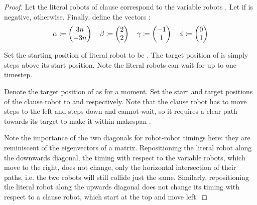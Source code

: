 \begin{proof}

	Let the literal robots  of clause  correspond to the variable robots . Let  if  is negative,  otherwise. Finally, define the vectors \ilmath{\set{\alpha,\ \beta,\ \gamma,\ \phi}}:
	\begin{align*}
	\alpha \coloneqq \begin{pmatrix} 3n \\ -3n \end{pmatrix} \quad 
	\beta \coloneqq \begin{pmatrix} 2 \\ 2 \end{pmatrix} \quad 
	\gamma \coloneqq \begin{pmatrix} -1 \\ 1 \end{pmatrix} \quad 
	\phi \coloneqq \begin{pmatrix} 0 \\ 1 \end{pmatrix}
	\end{align*}

	Set the starting position of literal robot  to be . The target position of  is simply  steps above its start position. Note the literal robots can wait for up to one timestep.


	Denote the target position of  as  for a moment. Set the start and target positions of the clause robot  to  and  respectively. Note that the clause robot has to move  steps to the left and  steps down and cannot wait, so it requires a clear path towards its target to make it within makespan .
	
	Note the importance of the two diagonals for robot-robot timings here: they are reminiscent of the eigenvectors of a matrix. Repositioning the literal robot along the downwards \diagdegs diagonal, the timing with respect to the variable robots, which move to the right, does not change, only the horizontal intersection of their paths, i.e. the two robots will still collide just the same. Similarly, repositioning the literal robot along the upwards diagonal does not change its timing with respect to a clause robot, which start at the top and move left. 


\end{proof}
